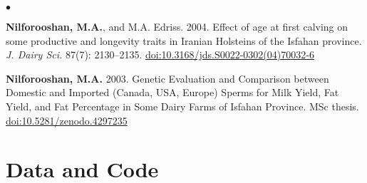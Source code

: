 \documentclass[margin,line]{res}
\newenvironment{list2}{
  \begin{list}{$\bullet$}{%
      \setlength{\itemsep}{0in}
      \setlength{\parsep}{0in} \setlength{\parskip}{0in}
      \setlength{\topsep}{0in} \setlength{\partopsep}{0in}
      \setlength{\leftmargin}{0.2in}}}{\end{list}}
\begin{document}
\begin{resume}
\begin{list2}
\item {\bf Nilforooshan, M.A.}, and M.A. Edriss. 2004. Effect of age at first calving on some productive and longevity traits in Iranian Holsteins of the Isfahan province. {\em J. Dairy Sci.} 87(7): 2130--2135. \href{https://doi.org/10.3168/jds.S0022-0302(04)70032-6}{doi:10.3168/jds.S0022-0302(04)70032-6}
\item {\bf Nilforooshan, M.A.} 2003. Genetic Evaluation and Comparison between Domestic and Imported (Canada, USA, Europe) Sperms for Milk Yield, Fat Yield, and Fat Percentage in Some Dairy Farms of Isfahan Province. MSc thesis. \href{https://doi.org/10.5281/zenodo.4297235}{doi:10.5281/zenodo.4297235}
\end{list2}
\section{\sc Data and Code}


\end{resume}
\end{document}
